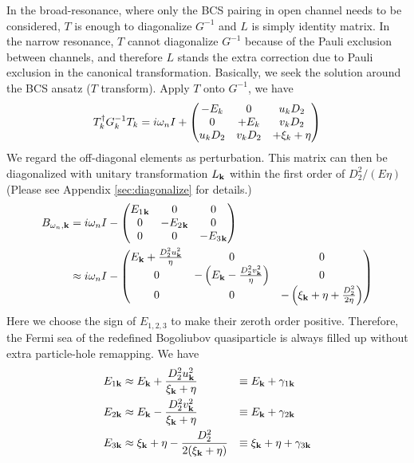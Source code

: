 In the broad-resonance, where only the BCS pairing in open channel needs to be considered, $T$ is enough to diagonalize $G^{-1}$ and $L$ is simply identity matrix.  %
In the narrow resonance, $T$ cannot diagonalize $G^{-1}$ because of the Pauli exclusion between channels, and therefore $L$ stands the extra correction due to Pauli exclusion in the canonical transformation. Basically, we seek the solution around the BCS ansatz ($T$ transform). 
Apply $T$ onto $G^{-1}$, we have 
\begin{equation}\label{eq:pathInt2:G2}
T_k^{\dagger}G_k^{-1}T_k=i\omega_nI+\begin{pmatrix}-E_k&0&u_kD_2\\0&+E_k&v_kD_2\\u_kD_2&v_kD_2&+\xi_k+\eta\end{pmatrix}
\end{equation}
We regard the off-diagonal elements as perturbation.  This matrix can then be diagonalized with  unitary transformation $L_{\mathbf{k}}$ within the first order of $D_{2}^{2}/(E\eta)$  (Please see Appendix \ref{sec:diagonalize} for details.)
\begin{equation}\label{eq:pathInt2:Bapprox}
\begin{split}
B_{\omega_{n},\mathbf{k}}&=i\omega_{n}I-
	\begin{pmatrix}E_{1}{}_{\mathbf{k}}&0&0\\0&-E_{2}{}_{\mathbf{k}}&0\\0&0&-E_{3}{}_{\mathbf{k}}\end{pmatrix}\\
	&\approx{}i\omega_{n}I-
	\begin{pmatrix}E_{\mathbf{k}}+\frac{D_{2}^{2}u_{\mathbf{k}}^{2}}{\eta}&0&0\\
	0&-\left(E_{\mathbf{k}}-\frac{D_{2}^{2}v_{\mathbf{k}}^{2}}{\eta}\right)&0\\0&0&-\left(\xi_{\mathbf{k}}+\eta+\frac{D_{2}^{2}}{2\eta}\right)\end{pmatrix}
\end{split}	
\end{equation}
Here we choose the sign of $E_{1,2,3}$  to make their zeroth order positive.  Therefore, the Fermi sea of the redefined Bogoliubov quasiparticle is always filled up without extra particle-hole remapping.  We have 
\begin{align}\label{eq:pathInt2:xiExpand}
E_{1\mathbf{k}}&\approx{}E_{\mathbf{k}}+\frac{D_{2}^{2}u_{\mathbf{k}}^{2}}{\xi_{\mathbf{k}}+\eta}&\equiv{}&E_{\mathbf{k}}+\gamma_{1\mathbf{k}}\\
E_{2\mathbf{k}}&\approx{}E_{\mathbf{k}}-\frac{D_{2}^{2}v_{\mathbf{k}}^{2}}{\xi_{\mathbf{k}}+\eta}&\equiv{}&E_{\mathbf{k}}+\gamma_{2\mathbf{k}}
\label{eq:pathInt2:xiExpand2}\\
E_{3\mathbf{k}}&\approx{}\xi_{\mathbf{k}}+\eta-\frac{D_{2}^{2}}{2(\xi_{\mathbf{k}}+\eta)}&\equiv{}&\xi_{\mathbf{k}}+\eta+\gamma_{3\mathbf{k}}
\label{eq:pathInt2:xiExpand3}
\end{align}

